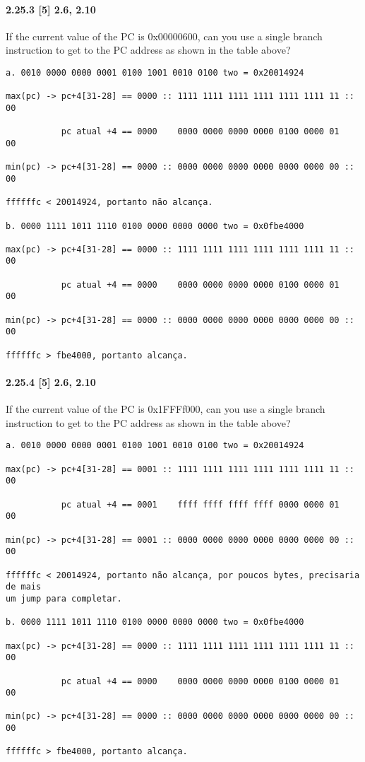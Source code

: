 \documentclass{article}
\begin{document}
\paragraph{2.25.3 [5] 2.6, 2.10} If the current value of the PC is 0x00000600, 
can you use a single branch instruction to get to the PC address as shown in 
the table above?

\begin{verbatim}
a. 0010 0000 0000 0001 0100 1001 0010 0100 two = 0x20014924

max(pc) -> pc+4[31-28] == 0000 :: 1111 1111 1111 1111 1111 1111 11 :: 00

           pc atual +4 == 0000    0000 0000 0000 0000 0100 0000 01    00

min(pc) -> pc+4[31-28] == 0000 :: 0000 0000 0000 0000 0000 0000 00 :: 00

ffffffc < 20014924, portanto não alcança.

b. 0000 1111 1011 1110 0100 0000 0000 0000 two = 0x0fbe4000

max(pc) -> pc+4[31-28] == 0000 :: 1111 1111 1111 1111 1111 1111 11 :: 00

           pc atual +4 == 0000    0000 0000 0000 0000 0100 0000 01    00

min(pc) -> pc+4[31-28] == 0000 :: 0000 0000 0000 0000 0000 0000 00 :: 00

ffffffc > fbe4000, portanto alcança.
\end{verbatim}

\paragraph{2.25.4  [5] 2.6, 2.10} If the current value of the PC is 0x1FFFf000, 
can you use a single branch instruction to get to the PC address as shown in 
the table above?

\begin{verbatim}
a. 0010 0000 0000 0001 0100 1001 0010 0100 two = 0x20014924

max(pc) -> pc+4[31-28] == 0001 :: 1111 1111 1111 1111 1111 1111 11 :: 00

           pc atual +4 == 0001    ffff ffff ffff ffff 0000 0000 01    00

min(pc) -> pc+4[31-28] == 0001 :: 0000 0000 0000 0000 0000 0000 00 :: 00

ffffffc < 20014924, portanto não alcança, por poucos bytes, precisaria de mais 
um jump para completar.

b. 0000 1111 1011 1110 0100 0000 0000 0000 two = 0x0fbe4000

max(pc) -> pc+4[31-28] == 0000 :: 1111 1111 1111 1111 1111 1111 11 :: 00

           pc atual +4 == 0000    0000 0000 0000 0000 0100 0000 01    00

min(pc) -> pc+4[31-28] == 0000 :: 0000 0000 0000 0000 0000 0000 00 :: 00

ffffffc > fbe4000, portanto alcança.
\end{verbatim}
\end{document}
